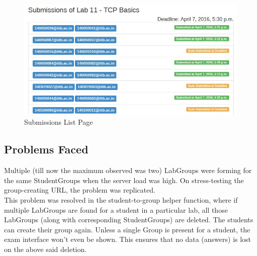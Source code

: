 \begin{figure}[H]
\includegraphics[width=\textwidth]{images/view_submissions}
\caption{Submissions List Page}
\label{fig:view_submissions}
\end{figure}

\subsection{Problems Faced}
Multiple (till now the maximum observed was two) LabGroups were forming for the same StudentGroups when the server load was high. On stress-testing the group-creating URL, the problem was replicated.\\

This problem was resolved in the student-to-group helper function, where if multiple LabGroups are found for a student in a particular lab, all those LabGroups (along with corresponding StudentGroups) are deleted. The students can create their group again. Unless a single Group is present for a student, the exam interface won't even be shown. This ensures that no data (answers) is lost on the above said deletion.
